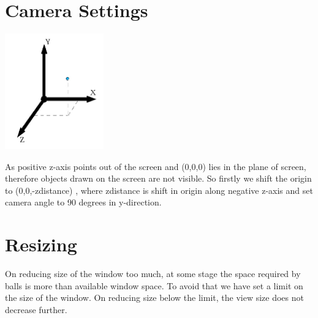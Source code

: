 \documentclass[a4paper,12pt]{report}
\begin{document}
\section{Camera Settings}
\begin{center}
\includegraphics[height=5cm]{axis.png}\\
\end{center}
As positive z-axis points out of the screen and (0,0,0) lies in the plane of screen, therefore objects drawn on the screen are not visible. So firstly we shift the origin to (0,0,-zdistance) , where zdistance is shift in origin along negative z-axis and set camera angle to 90 degrees in y-direction.
\section{Resizing}
On reducing size of the window too much, at some stage the space required by balls is more than available window space. To avoid that we have set a limit on the size of the window. On reducing size below the limit, the view size does not decrease further.
\end{document}
